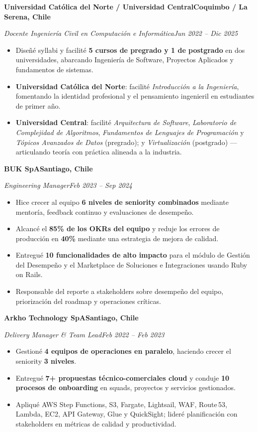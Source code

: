\documentclass[11pt,a4paper]{article}
\newcommand{\entry}[4]{%
  \textbf{#1}\hfill\textbf{#2}\par
  \textit{#3}\hfill\textit{#4}\par\vspace{2pt}%
}
\begin{document}
\entry{Universidad Católica del Norte / Universidad Central}{Coquimbo / La Serena, Chile}{Docente Ingeniería Civil en Computación e Informática}{Jun 2022 -- Dic 2025}
\begin{itemize}
  \item Diseñé syllabi y facilité \textbf{5 cursos de pregrado y 1 de postgrado} en dos universidades, abarcando Ingeniería de Software, Proyectos Aplicados y fundamentos de sistemas.
  \item \textbf{Universidad Católica del Norte}: facilité \textit{Introducción a la Ingeniería}, fomentando la identidad profesional y el pensamiento ingenieril en estudiantes de primer año.
  \item \textbf{Universidad Central}: facilité \textit{Arquitectura de Software}, \textit{Laboratorio de Complejidad de Algoritmos}, \textit{Fundamentos de Lenguajes de Programación} y \textit{Tópicos Avanzados de Datos} (pregrado); y \textit{Virtualización} (postgrado) --- articulando teoría con práctica alineada a la industria.
\end{itemize}


\entry{BUK SpA}{Santiago, Chile}{Engineering Manager}{Feb 2023 -- Sep 2024}
\begin{itemize}
  \item Hice crecer al equipo \textbf{6 niveles de seniority combinados} mediante mentoría,
        feedback continuo y evaluaciones de desempeño.
  \item Alcancé el \textbf{85\% de los OKRs del equipo} y reduje los errores de producción en
        \textbf{40\%} mediante una estrategia de mejora de calidad.
  \item Entregué \textbf{10 funcionalidades de alto impacto} para el módulo de Gestión del
        Desempeño y el Marketplace de Soluciones e Integraciones usando Ruby on Rails.
  \item Responsable del reporte a stakeholders sobre desempeño del equipo, priorización del
        roadmap y operaciones críticas.
\end{itemize}

\entry{Arkho Technology SpA}{Santiago, Chile}{Delivery Manager \& Team Lead}{Feb 2022 -- Feb 2023}
\begin{itemize}
  \item Gestioné \textbf{4 equipos de operaciones en paralelo}, haciendo crecer el seniority
        \textbf{3 niveles}.
  \item Entregué \textbf{7+ propuestas técnico-comerciales cloud} y conduje \textbf{10 procesos
        de onboarding} en squads, proyectos y servicios gestionados.
  \item Apliqué AWS Step Functions, S3, Fargate, Lightsail, WAF, Route\,53, Lambda, EC2, API
        Gateway, Glue y QuickSight; lideré planificación con stakeholders en métricas de calidad
        y productividad.
\end{itemize}
\end{document}
